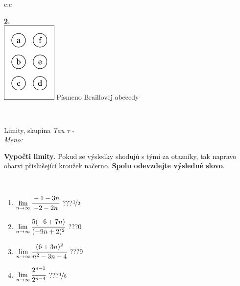 \documentclass[10pt]{report}
\begin{document}
\begin{tabular}{c:c}
\begin{minipage}[c][104.5mm][t]{0.5\linewidth}
\begin{center}
\begin{minipage}{0.20\linewidth}
\begin{center}
{\Huge\bfseries 2.} \\[2mm]
\includegraphics[height=40mm]{../images/braille.png}
{\small Písmeno Braillovej abecedy}
\end{center}
\end{minipage}
\end{center}
\end{minipage}
\\ \hdashline
\begin{minipage}[c][104.5mm][t]{0.5\linewidth}
\begin{center}
\vspace{7mm}
{\huge Limity, skupina \textit{Tau $\tau$} -}\\[5mm]
\textit{Meno:}\phantom{xxxxxxxxxxxxxxxxxxxxxxxxxxxxxxxxxxxxxxxxxxxxxxxxxxxxxxxxxxxxxxxxx}\\[5mm]
\begin{minipage}{0.95\linewidth}
\begin{center}
\textbf{Vypočti limity}. Pokud se výsledky shodujú s tými za otazníky, tak napravo\\obarvi příslušející kroužek načerno. \textbf{Spolu odevzdejte výsledné slovo}.
\end{center}
\end{minipage}
\\[1mm]
\begin{minipage}{0.79\linewidth}
\begin{center}
\begin{varwidth}{\linewidth}
\begin{enumerate}
\normalsize
\item $\lim\limits_{n\to\infty}\cfrac{-1-3n}{-2-2n}$\quad \dotfill\; ???\;\dotfill \quad $\nicefrac{1}{2}$
\item $\lim\limits_{n\to\infty}\cfrac{5(-6+7n)}{(-9n+2)^2}$\quad \dotfill\; ???\;\dotfill \quad $0$
\item $\lim\limits_{n\to\infty}\cfrac{(6+3n)^2}{n^2-3n-4}$\quad \dotfill\; ???\;\dotfill \quad $9$
\item $\lim\limits_{n\to\infty}\cfrac{2^{n-1}}{2^{n-4}}$\quad \dotfill\; ???\;\dotfill \quad $\nicefrac{1}{8}$

\end{enumerate}
\end{varwidth}
\end{center}
\end{minipage}
\end{center}
\end{minipage}
\end{tabular}
\end{document}
